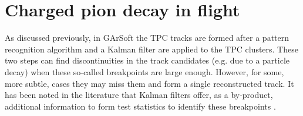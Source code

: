 \section{Charged pion decay in flight}

As discussed previously, in GArSoft the TPC tracks are formed after a pattern recognition algorithm and a Kalman filter are applied to the TPC clusters. These two steps can find discontinuities in the track candidates (e.g. due to a particle decay) when these so-called breakpoints are large enough. However, for some, more subtle, cases they may miss them and form a single reconstructed track. It has been noted in the literature that Kalman filters offer, as a by-product, additional information to form test statistics to identify these breakpoints \cite{Fruehwirth1988, Astier2000}.

